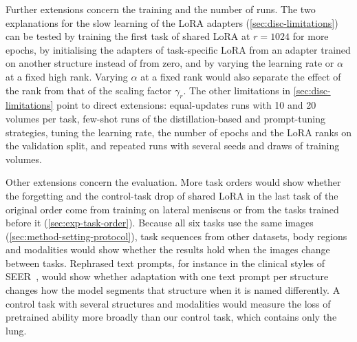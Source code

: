Further extensions concern the training and the number of runs.
The two explanations for the slow learning of the LoRA adapters (\cref{sec:disc-limitations}) can be tested by training the first task of shared LoRA at $r = 1024$ for more epochs, by initialising the adapters of task-specific LoRA from an adapter trained on another structure instead of from zero, and by varying the learning rate or $\alpha$ at a fixed high rank.
Varying $\alpha$ at a fixed rank would also separate the effect of the rank from that of the scaling factor $\gamma_r$.
The other limitations in \cref{sec:disc-limitations} point to direct extensions: equal-updates runs with 10 and 20 volumes per task, few-shot runs of the distillation-based and prompt-tuning strategies, tuning the learning rate, the number of epochs and the LoRA ranks on the validation split, and repeated runs with several seeds and draws of training volumes.

Other extensions concern the evaluation.
More task orders would show whether the forgetting and the control-task drop of shared LoRA in the last task of the original order come from training on lateral meniscus or from the tasks trained before it (\cref{sec:exp-task-order}).
Because all six tasks use the same images (\cref{sec:method-setting-protocol}), task sequences from other datasets, body regions and modalities would show whether the results hold when the images change between tasks.
Rephrased text prompts, for instance in the clinical styles of SEER~\cite{zhang2026seer}, would show whether adaptation with one text prompt per structure changes how the model segments that structure when it is named differently.
A control task with several structures and modalities would measure the loss of pretrained ability more broadly than our control task, which contains only the lung.
